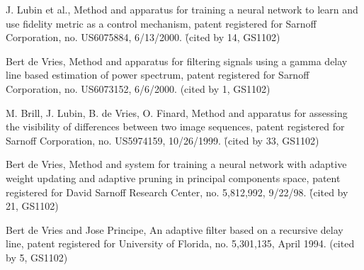 \begin{etaremune}
\item  J. Lubin et al., Method and apparatus for training a neural network to learn and use fidelity metric as a control mechanism, patent registered for
Sarnoff Corporation, no. US6075884, 6/13/2000. \r{(cited by 14, GS1102)}

\item Bert de Vries, Method and apparatus for filtering signals using a gamma delay line based estimation of power spectrum, patent
registered for Sarnoff Corporation, no. US6073152, 6/6/2000. (cited by 1, GS1102)

\item M. Brill, J. Lubin, B. de Vries, O. Finard, Method and apparatus for assessing the visibility of differences between two image sequences, patent registered for Sarnoff Corporation, no.
US5974159, 10/26/1999. \r{(cited by 33, GS1102)}

\item Bert de Vries, Method and system for training a neural network with adaptive
weight updating and adaptive pruning in principal components space,
patent registered for David Sarnoff Research
Center, no. 5,812,992, 9/22/98. \r{(cited by 21, GS1102)}

\item Bert de Vries and Jose Principe, An adaptive filter based on a recursive delay line,  patent registered
for University of Florida, no. 5,301,135, April 1994. (cited by 5, GS1102)

\end{etaremune}







